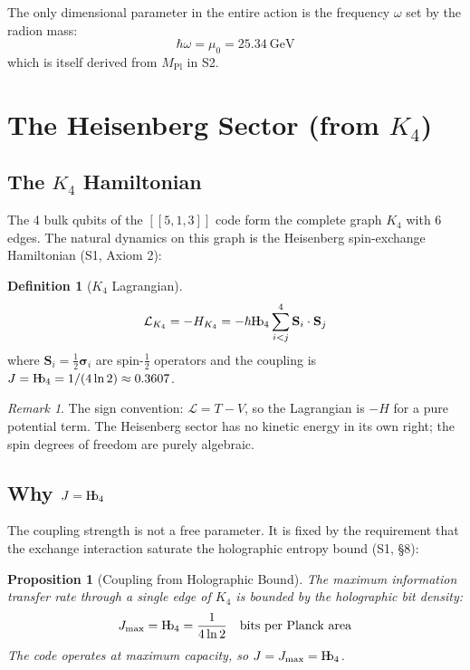\documentclass[11pt,a4paper]{article}
\newtheorem{proposition}[theorem]{Proposition}
\theoremstyle{definition}
\newtheorem{definition}[theorem]{Definition}
\theoremstyle{remark}
\newtheorem{remark}[theorem]{Remark}
\newcommand{\Hb}{\textnormal{H\kern-0.3em b}}
\newcommand{\Hbfour}{\Hb_4}
\newcommand{\murad}{\mu_0}
\newcommand{\Mpl}{M_{\mathrm{Pl}}}
\newcommand{\LL}{\mathcal{L}}
\begin{document}
The only dimensional parameter in the entire action is the frequency $\omega$ set by the radion mass:
\begin{equation}
\hbar\omega = \murad = 25.34~\text{GeV}
\end{equation}
which is itself derived from $\Mpl$ in S2.

\section{The Heisenberg Sector (from $K_4$)}
\label{sec:K4}

\subsection{The $K_4$ Hamiltonian}

The 4 bulk qubits of the $[[5,1,3]]$ code form the complete graph $K_4$ with 6 edges. The natural dynamics on this graph is the Heisenberg spin-exchange Hamiltonian (S1, Axiom 2):

\begin{definition}[$K_4$ Lagrangian]
\label{def:LK4}
\begin{equation}
\LL_{K_4} = -H_{K_4} = -\hbar\Hbfour \sum_{i<j}^{4} \mathbf{S}_i \cdot \mathbf{S}_j
\end{equation}
where $\mathbf{S}_i = \tfrac{1}{2}\boldsymbol{\sigma}_i$ are spin-$\frac{1}{2}$ operators and the coupling is $J = \Hbfour = 1/(4\ln 2) \approx 0.3607$.
\end{definition}

\begin{remark}
The sign convention: $\LL = T - V$, so the Lagrangian is $-H$ for a pure potential term. The Heisenberg sector has no kinetic energy in its own right; the spin degrees of freedom are purely algebraic.
\end{remark}

\subsection{Why $J = \Hbfour$}

The coupling strength is not a free parameter. It is fixed by the requirement that the exchange interaction saturate the holographic entropy bound (S1, \S8):

\begin{proposition}[Coupling from Holographic Bound]
\label{prop:J}
The maximum information transfer rate through a single edge of $K_4$ is bounded by the holographic bit density:
\begin{equation}
J_{\mathrm{max}} = \Hbfour = \frac{1}{4\ln 2} \quad \text{bits per Planck area}
\end{equation}
The code operates at maximum capacity, so $J = J_{\mathrm{max}} = \Hbfour$.
\end{proposition}
\end{document}
